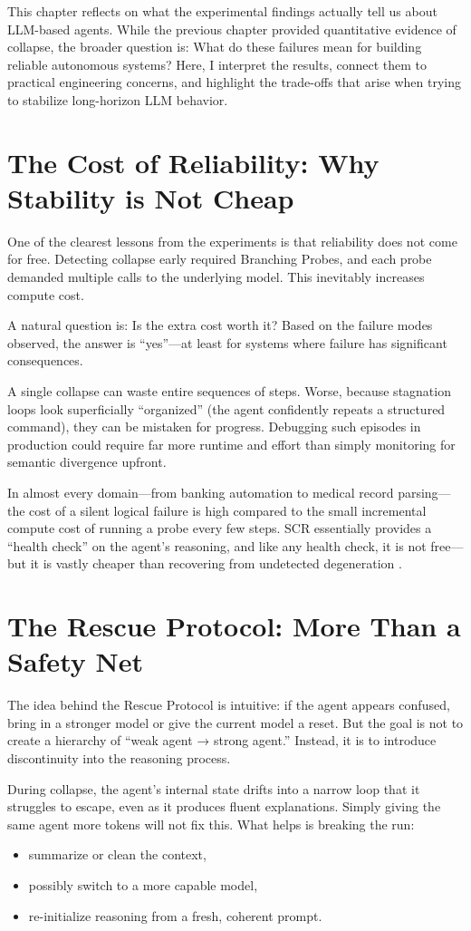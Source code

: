\documentclass[12pt,a4paper]{report}
\begin{document}
This chapter reflects on what the experimental findings actually tell us about LLM-based agents. While the previous chapter provided quantitative evidence of collapse, the broader question is: What do these failures mean for building reliable autonomous systems? Here, I interpret the results, connect them to practical engineering concerns, and highlight the trade-offs that arise when trying to stabilize long-horizon LLM behavior.

\section{The Cost of Reliability: Why Stability is Not Cheap}
One of the clearest lessons from the experiments is that reliability does not come for free. Detecting collapse early required Branching Probes, and each probe demanded multiple calls to the underlying model. This inevitably increases compute cost.

A natural question is: Is the extra cost worth it? Based on the failure modes observed, the answer is “yes”—at least for systems where failure has significant consequences.

A single collapse can waste entire sequences of steps. Worse, because stagnation loops look superficially “organized” (the agent confidently repeats a structured command), they can be mistaken for progress. Debugging such episodes in production could require far more runtime and effort than simply monitoring for semantic divergence upfront.

In almost every domain—from banking automation to medical record parsing—the cost of a silent logical failure is high compared to the small incremental compute cost of running a probe every few steps. SCR essentially provides a “health check” on the agent’s reasoning, and like any health check, it is not free—but it is vastly cheaper than recovering from undetected degeneration \cite{Zhou2024Consistency}.

\section{The Rescue Protocol: More Than a Safety Net}
The idea behind the Rescue Protocol is intuitive: if the agent appears confused, bring in a stronger model or give the current model a reset. But the goal is not to create a hierarchy of “weak agent → strong agent.” Instead, it is to introduce discontinuity into the reasoning process.

During collapse, the agent’s internal state drifts into a narrow loop that it struggles to escape, even as it produces fluent explanations. Simply giving the same agent more tokens will not fix this. What helps is breaking the run:
\begin{itemize}
    \item summarize or clean the context,
    \item possibly switch to a more capable model,
    \item re-initialize reasoning from a fresh, coherent prompt.
\end{itemize}
\end{document}
